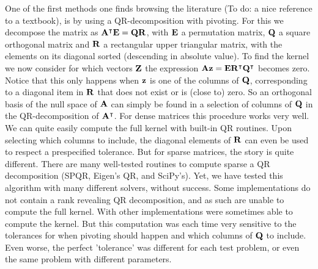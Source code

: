 One of the first methods one finds browsing the literature ({\color{red}To do: a nice reference to a textbook}), is by using a QR-decomposition with pivoting. For this we decompose the matrix as ${\vb{A}}^\intercal\vb{E} = \vb{Q} \vb{R}$, with $\vb{E}$ a permutation matrix, $\vb{Q}$ a square orthogonal matrix and $\vb{R}$ a rectangular upper triangular matrix, with the elements on its diagonal sorted (descending in absolute value). To find the kernel we now consider for which vectors $\vb{Z}$ the expression $\vb{A} \vb{z} = \vb{E}{\vb{R}}^\intercal{\vb{Q}}^\intercal$ becomes zero. Notice that this only happens when $\vb{z}$ is one of the columns of $\vb{Q}$, corresponding to a diagonal item in $\vb{R}$ that does not exist or is (close to) zero. So an orthogonal basis of the null space of $\vb{A}$ can simply be found in a selection of columns of $\vb{Q}$ in the QR-decomposition of ${\vb{A}}^\intercal$. For dense matrices this procedure works very well. We can quite easily compute the full kernel with built-in QR routines. Upon selecting which columns to include, the diagonal elements of $\vb{R}$ can even be used to respect a prespecified tolerance. But for sparse matrices, the story is quite different. There are many well-tested routines to compute sparse a QR decomposition (SPQR, Eigen's QR, and SciPy's). Yet, we have tested this algorithm with many different solvers, without success. Some implementations do not contain a rank revealing QR decomposition, and as such are unable to compute the full kernel. With other implementations were sometimes able to compute the kernel. But this computation was each time very sensitive to the tolerances for when pivoting should happen and which columns of $\vb{Q}$ to include. Even worse, the perfect 'tolerance' was different for each test problem, or even the same problem with different parameters.

